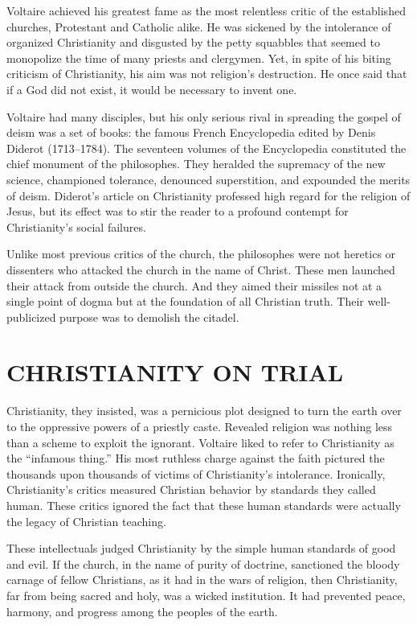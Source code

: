 Voltaire achieved his greatest fame as the most relentless critic of the established churches,
Protestant and Catholic alike. He was sickened by the intolerance of organized Christianity and
disgusted by the petty squabbles that seemed to monopolize the time of many priests and clergymen.
Yet, in spite of his biting criticism of Christianity, his aim was not religion’s destruction. He
once said that if a God did not exist, it would be necessary to invent one.

Voltaire had many disciples, but his only serious rival in spreading the gospel of deism was a set
of books: the famous French Encyclopedia edited by Denis Diderot (1713–1784). The seventeen volumes
of the Encyclopedia constituted the chief monument of the philosophes. They heralded the supremacy
of the new science, championed tolerance, denounced superstition, and expounded the merits of deism.
Diderot’s article on Christianity professed high regard for the religion of Jesus, but its effect
was to stir the reader to a profound contempt for Christianity’s social failures.

Unlike most previous critics of the church, the philosophes were not heretics or dissenters who
attacked the church in the name of Christ. These men launched their attack from outside the church.
And they aimed their missiles not at a single point of dogma but at the foundation of all Christian
truth. Their well-publicized purpose was to demolish the citadel.

\section{CHRISTIANITY ON TRIAL}

Christianity, they insisted, was a pernicious plot designed to turn the earth over to the oppressive
powers of a priestly caste. Revealed religion was nothing less than a scheme to exploit the
ignorant. Voltaire liked to refer to Christianity as the “infamous thing.” His most ruthless charge
against the faith pictured the thousands upon thousands of victims of Christianity’s intolerance.
Ironically, Christianity’s critics measured Christian behavior by standards they called human. These
critics ignored the fact that these human standards were actually the legacy of Christian teaching.

These intellectuals judged Christianity by the simple human standards of good and evil. If the
church, in the name of purity of doctrine, sanctioned the bloody carnage of fellow Christians, as it
had in the wars of religion, then Christianity, far from being sacred and holy, was a wicked
institution. It had prevented peace, harmony, and progress among the peoples of the earth.

